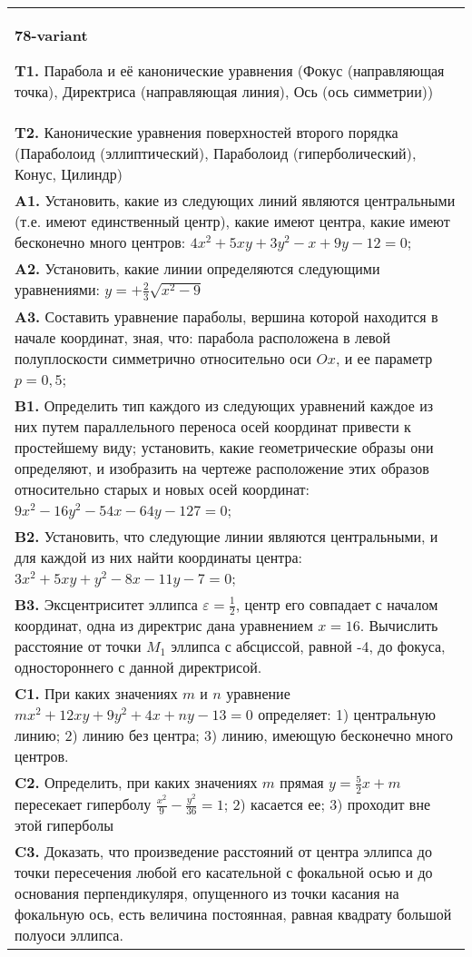 \documentclass{article}
\begin{document}
\begin{tabular}{m{17cm}}
\textbf{78-variant}
\newline

\textbf{T1.} Парабола и её канонические уравнения (Фокус (направляющая точка), Директриса (направляющая линия), Ось (ось симметрии)) \\
\textbf{T2.} Канонические уравнения поверхностей второго порядка (Параболоид (эллиптический), Параболоид (гиперболический), Конус, Цилиндр) \\
\textbf{A1.} Установить, какие из следующих линий являются центральными (т.е. имеют единственный центр), какие имеют центра, какие имеют бесконечно много центров: $4 x^2+5 x y+3 y^2-x+9 y-12=0$; \\
\textbf{A2.} Установить, какие линии определяются следующими уравнениями: $y=+\frac{2}{3} \sqrt{x^2-9}$ \\
\textbf{A3.} Составить уравнение параболы, вершина которой находится в начале координат, зная, что: парабола расположена в левой полуплоскости симметрично относительно оси $O x$, и ее параметр $p=0,5$; \\
\textbf{B1.} Определить тип каждого из следующих уравнений каждое из них путем параллельного переноса осей координат привести к простейшему виду; установить, какие геометрические образы они определяют, и изобразить на чертеже расположение этих образов относительно старых и новых осей координат: $9 x^2-16 y^2-54 x-64 y-127=0$; \\
\textbf{B2.} Установить, что следующие линии являются центральными, и для каждой из них найти координаты центра: $3 x^2+5 x y+y^2-8 x-11 y-7=0$; \\
\textbf{B3.} Эксцентриситет эллипса $\varepsilon=\frac{1}{2}$, центр его совпадает с началом координат, одна из директрис дана уравнением $x=16$. Вычислить расстояние от точки $M_1$ эллипса с абсциссой, равной -4, до фокуса, одностороннего с данной директрисой. \\
\textbf{C1.} При каких значениях $m$ и $n$ уравнение $m x^2+12 x y+9 y^2+4 x+n y-13=0$ определяет: 1) центральную линию; 2) линию без центра; 3) линию, имеющую бесконечно много центров. \\
\textbf{C2.} Определить, при каких значениях $m$ прямая $y=\frac{5}{2} x+m$ пересекает гиперболу $\frac{x^2}{9}-\frac{y^2}{36}=1$; 2) касается ее; 3) проходит вне этой гиперболы \\
\textbf{C3.} Доказать, что произведение расстояний от центра эллипса до точки пересечения любой его касательной с фокальной осью и до основания перпендикуляря, опущенного из точки касания на фокальную ось, есть величина постоянная, равная квадрату большой полуоси эллипса. \\

\end{tabular}
\vspace{1cm}
\end{document}
